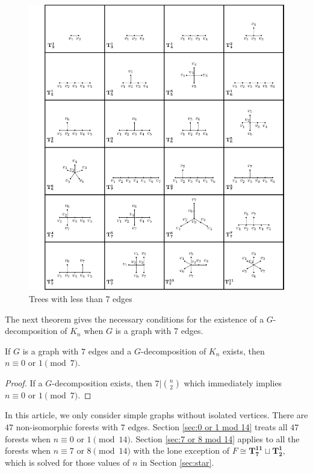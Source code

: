 \documentclass{dmgt}
\begin{document}
\begin{figure}[]
\centering
    \includegraphics{tree chart.pdf}
    \caption{Trees with less than 7 edges}
    \label{fig:catalog}
\end{figure}
The next theorem gives the necessary conditions for the existence of a $G$-decomposition of $K_n$ when $G$ is a graph with 7 edges.

\begin{theorem}
  If $G$ is a graph with $7$ edges and a $G$-decomposition of $K_n$ exists, then $n \equiv 0 \textrm{ or }  1 \pmod{7}.$  
\end{theorem}
\begin{proof}
    If a $G$-decomposition exists, then $7 | \binom{n}{2}$ which immediately implies $n \equiv 0 \textrm{ or }  1 \pmod{7}.$
\end{proof}

In this article, we only consider simple graphs without isolated vertices. There are $47$ non-isomorphic forests with $7$ edges. Section \ref{sec:0 or 1 mod 14} treats all $47$ forests when $n \equiv 0 \textrm{ or } 1 \pmod{14}$. Section \ref{sec:7 or 8 mod 14} applies to all the forests when $n \equiv 7 \textrm{ or } 8 \pmod{14}$ with the lone exception of $F \cong \mathbf{T_{7}^{11}}\sqcup\mathbf{T_{2}^{1}},$ which  is solved for those values of $n$ in Section \ref{sec:star}. 
\end{document}
